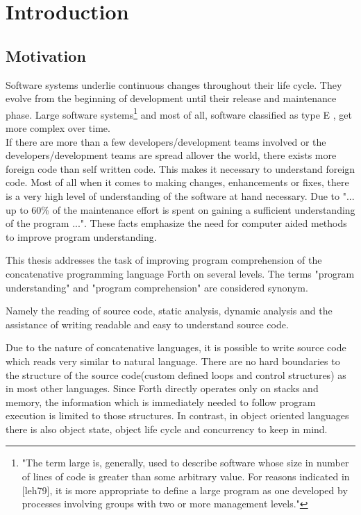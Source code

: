 \chapter{Introduction}

\section*{Motivation}

Software systems underlie continuous changes throughout their life cycle.
They evolve from the beginning of development until their release and maintenance phase. Large software systems\footnote{"The term large is, generally, used to describe software whose size in number of lines of code is greater than some arbitrary value. For reasons indicated in [leh79], it is more appropriate to define a large program as one developed by processes involving groups with two or more management levels."\cite{Lehman:2003:SEB:950401.950407}} and most of all, software  classified as type E \cite{Cook:2006:ESS:1115566.1115567}, get more complex over time.\\
If there are more than a few developers/development teams involved or the developers/development teams are spread allover the world, there exists more foreign code than self written code. This makes it necessary to understand foreign code.
Most of all when it comes to making changes, enhancements or fixes, there is a very high level of understanding of the software at hand necessary\cite{Boehm:1976:SE:1311958.1312684}\cite{Singer97anexamination}. Due to \cite{Cornelissen:2009:SSP:1638616.1639301} "... up to 60\% of the maintenance effort is spent on gaining a sufficient understanding of the program ...". These facts emphasize the need for computer aided methods to improve program understanding.

This thesis addresses the task of improving program comprehension of the concatenative programming language Forth on several levels. The terms "program understanding" and "program comprehension" are considered synonym. 

Namely the reading of source code, static analysis, dynamic analysis and the assistance of writing readable and easy to understand source code.

Due to the nature of concatenative languages, it is possible to write source code which reads very similar to natural language. There are no hard boundaries to the structure of the source code(custom defined loops and control structures) as in most other languages. Since Forth directly operates only on stacks and memory, the information which is immediately needed to follow program execution is limited to those structures. In contrast, in object oriented languages there is also object state, object life cycle and concurrency to keep in mind.

